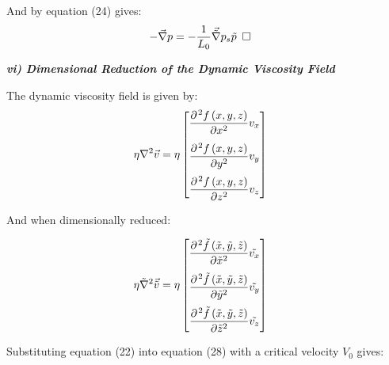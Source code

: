 \documentclass[titlepage]{article}
\begin{document}
    \noindent And by equation (24) gives:
    \begin{align}
        -\vec{\nabla}p &= -\displaystyle\frac{1}{L_{0}}\vec{\tilde{\nabla}}p_{s}\tilde{p}\hspace*{5pt}\square
    \end{align}

    \begin{center}
        \textbf{\emph{vi) Dimensional Reduction of the Dynamic Viscosity Field}}
    \end{center}

    \noindent The dynamic viscosity field is given by: 
    \begin{align}
        \eta\nabla^2\vec{v} &=\eta\begin{bmatrix}
            \displaystyle\frac{\partial^{\hspace*{1pt}2}{f\left(x,y,z\right)}}{\partial{x^{2}}}v_{x} \\[0.4cm]
            \displaystyle\frac{\partial^{\hspace*{1pt}2}{f\left(x,y,z\right)}}{\partial{y^{2}}}v_{y}  \\[0.4cm]
            \displaystyle\frac{\partial^{\hspace*{1pt}2}{f\left(x,y,z\right)}}{\partial{z^{2}}}v_{z}
        \end{bmatrix}
    \end{align}

    \noindent And when dimensionally reduced: 

    \begin{align}
        {\eta}\tilde{\nabla}^2\vec{\tilde{v}} &= {\eta}\begin{bmatrix}
            \displaystyle\frac{\partial^{\hspace*{1pt}2}{\tilde{f}\left(\tilde{x},\tilde{y},\tilde{z}\right)}}{\partial{\tilde{x}^{2}}}\tilde{v_{x}} \\[0.4cm]
            \displaystyle\frac{\partial^{\hspace*{1pt}2}{\tilde{f}\left(\tilde{x},\tilde{y},\tilde{z}\right)}}{\partial{\tilde{y}^{2}}}\tilde{v_{y}}  \\[0.4cm]
            \displaystyle\frac{\partial^{\hspace*{1pt}2}{\tilde{f}\left(\tilde{x},\tilde{y},\tilde{z}\right)}}{\partial{\tilde{z}^{2}}} \tilde{v_{z}}
        \end{bmatrix}
    \end{align}

    \newpage
    \noindent Substituting equation (22) into equation (28) with a critical velocity $V_{0}$ gives: 
\end{document}
